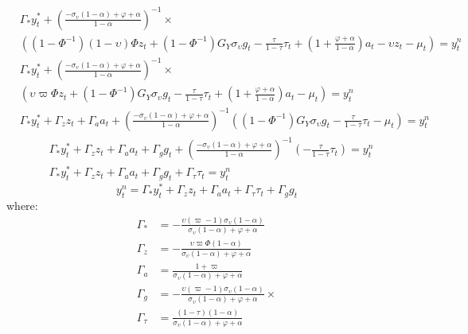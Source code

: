 \begin{align}
    &\Gamma_* y^*_t + \left(\frac{-\sigma_\upsilon(1-\alpha) + \varphi + \alpha}{1-\alpha}\right)^{-1}\times\nonumber \\ 
        &\left((1 - \Phi^{-1}) (1-\upsilon)\Phi z_t + (1 - \Phi^{-1}) G_Y \sigma_\upsilon g_t - \frac{\tau}{1-\tau}\tau_t  + \left(1 + \frac{\varphi + \alpha}{1-\alpha}\right)a_t - \upsilon z_t -\mu_t \right)= y^n_t\\
    &\Gamma_* y^*_t + \left(\frac{-\sigma_\upsilon(1-\alpha) + \varphi + \alpha}{1-\alpha}\right)^{-1}\times\nonumber \\ 
        &\left(\upsilon \varpi \Phi z_t + (1 - \Phi^{-1}) G_Y \sigma_\upsilon g_t - \frac{\tau}{1-\tau}\tau_t  + \left(1 + \frac{\varphi + \alpha}{1-\alpha}\right)a_t -\mu_t \right)= y^n_t\\
    &\Gamma_* y^*_t + \Gamma_z z_t + \Gamma_a a_t + \left(\frac{-\sigma_\upsilon(1-\alpha) + \varphi + \alpha}{1-\alpha}\right)^{-1}\left((1 - \Phi^{-1}) G_Y \sigma_\upsilon g_t - \frac{\tau}{1-\tau}\tau_t -\mu_t \right)= y^n_t
\end{align}
\begin{align}
    &\Gamma_* y^*_t + \Gamma_z z_t + \Gamma_a a_t + \Gamma_g g_t + \left(\frac{-\sigma_\upsilon(1-\alpha) + \varphi + \alpha}{1-\alpha}\right)^{-1}\left(- \frac{\tau}{1-\tau}\tau_t \right)= y^n_t\\
    &\Gamma_* y^*_t + \Gamma_z z_t + \Gamma_a a_t + \Gamma_g g_t + \Gamma_\tau \tau_t = y^n_t
\end{align}
\begin{equation}
    y^n_t = \Gamma_* y^*_t + \Gamma_z z_t + \Gamma_a a_t + \Gamma_\tau \tau_t + \Gamma_g g_t
\end{equation}
where:
\begin{align}
    \Gamma_* &= -\frac{\upsilon(\varpi - 1)\sigma_\upsilon(1-\alpha)}{\sigma_\upsilon (1-\alpha) + \varphi + \alpha} \\
    \Gamma_z &= -\frac{\upsilon \varpi \Phi (1-\alpha)}{\sigma_\upsilon (1-\alpha) + \varphi + \alpha} \\
    \Gamma_a &= \frac{1+\varpi}{\sigma_\upsilon (1-\alpha) + \varphi + \alpha} \\
    \Gamma_g &= -\frac{\upsilon(\varpi - 1)\sigma_\upsilon(1-\alpha)}{\sigma_\upsilon (1-\alpha) + \varphi + \alpha} \times\\
    \Gamma_\tau &= \frac{(1-\tau)(1-\alpha)}{\sigma_\upsilon (1-\alpha) + \varphi + \alpha} \label{eq:appendix_natural_level_of_output_end}
\end{align}
\newpage